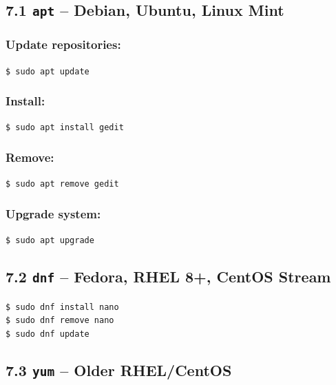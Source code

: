 \documentclass[12pt]{article}
\begin{document}
\subsection*{7.1 \texttt{apt} – Debian, Ubuntu, Linux Mint}

\subsubsection*{Update repositories:}

\begin{highlightbox}
\texttt{\$ sudo apt update}
\end{highlightbox}

\subsubsection*{Install:}

\begin{highlightbox}
\texttt{\$ sudo apt install gedit}
\end{highlightbox}

\subsubsection*{Remove:}

\begin{highlightbox}
\texttt{\$ sudo apt remove gedit}
\end{highlightbox}

\subsubsection*{Upgrade system:}

\begin{highlightbox}
\texttt{\$ sudo apt upgrade}
\end{highlightbox}

\subsection*{7.2 \texttt{dnf} – Fedora, RHEL 8+, CentOS Stream}

\begin{highlightbox}
\texttt{\$ sudo dnf install nano}\\
\texttt{\$ sudo dnf remove nano}\\
\texttt{\$ sudo dnf update}
\end{highlightbox}

\subsection*{7.3 \texttt{yum} – Older RHEL/CentOS}
\end{document}
